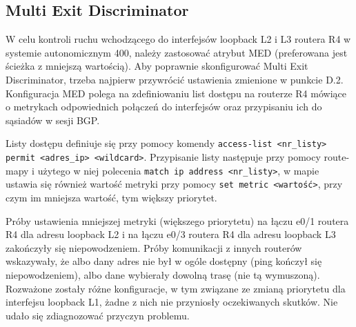 \documentclass[a4paper,12pt,notitlepage]{article}
\begin{document}
\subsection{Multi Exit Discriminator}

W celu kontroli ruchu wchodzącego do interfejsów loopback L2 i L3 routera R4 w systemie autonomicznym 400, należy zastosować atrybut MED (preferowana jest ścieżka z mniejszą wartością). Aby poprawnie skonfigurować Multi Exit Discriminator, trzeba najpierw przywrócić ustawienia zmienione w punkcie D.2. Konfiguracja MED polega na zdefiniowaniu list dostępu na routerze R4 mówiące o metrykach odpowiednich połączeń do interfejsów oraz przypisaniu ich do sąsiadów w sesji BGP.

Listy dostępu definiuje się przy pomocy komendy \texttt{access-list <nr_listy> permit <adres_ip> <wildcard>}. Przypisanie listy następuje przy pomocy route-mapy i użytego w niej polecenia  \texttt{match ip address <nr_listy>}, w mapie ustawia się również wartość metryki przy pomocy  \texttt{set metric <wartość>}, przy czym im mniejsza wartość, tym większy priorytet.

Próby ustawienia mniejszej metryki (większego priorytetu) na łączu e0/1 routera R4 dla adresu loopback L2 i na łączu e0/3 routera R4 dla adresu loopback L3 zakończyły się niepowodzeniem. Próby komunikacji z innych routerów wskazywały, że albo dany adres nie był w ogóle dostępny (ping kończył się niepowodzeniem), albo dane wybierały dowolną trasę (nie tą wymuszoną). Rozważone zostały różne konfiguracje, w tym związane ze zmianą priorytetu dla interfejsu loopback L1, żadne z nich nie przyniosły oczekiwanych skutków. Nie udało się zdiagnozować przyczyn problemu.
\end{document}
